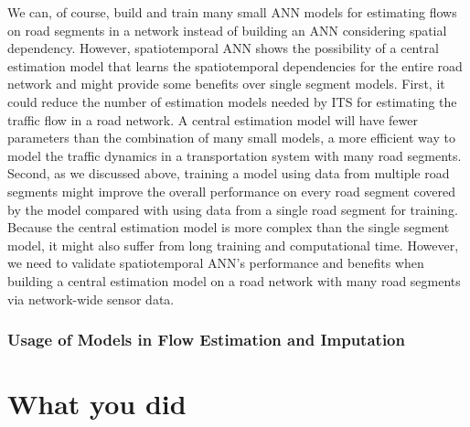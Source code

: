 \documentclass[english]{kththesis}
\begin{document}
We can, of course, build and train many small ANN models for estimating flows on road segments in a network instead of building an ANN considering spatial dependency. However, spatiotemporal ANN shows the possibility of a central estimation model that learns the spatiotemporal dependencies for the entire road network and might provide some benefits over single segment models. First, it could reduce the number of estimation models needed by ITS for estimating the traffic flow in a road network. A central estimation model will have fewer parameters than the combination of many small models, a more efficient way to model the traffic dynamics in a transportation system with many road segments. Second, as we discussed above, training a model using data from multiple road segments might improve the overall performance on every road segment covered by the model compared with using data from a single road segment for training. Because the central estimation model is more complex than the single segment model, it might also suffer from long training and computational time. However, we need to validate spatiotemporal ANN's performance and benefits when building a central estimation model on a road network with many road segments via network-wide sensor data.

\subsection{Usage of Models in Flow Estimation and Imputation}
\label{subsec:discussionModelUsage}





\cleardoublepagepage









































\chapter{What you did}
\label{ch:whatYouDid}
\end{document}
